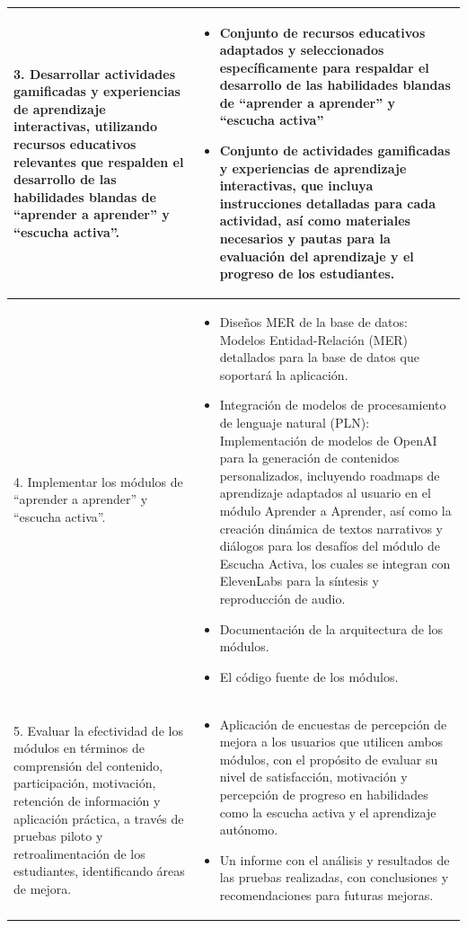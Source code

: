 \begin{longtable}{|p{8cm}|p{8cm}|}
3. Desarrollar actividades gamificadas y experiencias de aprendizaje interactivas, utilizando recursos educativos relevantes que respalden el desarrollo de las habilidades blandas de “aprender a aprender” y “escucha activa”. 
& \begin{itemize}[leftmargin=*, topsep=0pt, partopsep=0pt, parsep=0pt, itemsep=0.4\baselineskip]
     \item Conjunto de recursos educativos adaptados y seleccionados específicamente para respaldar el desarrollo de las habilidades blandas de “aprender a aprender” y “escucha activa”
    \item Conjunto de actividades gamificadas y experiencias de aprendizaje interactivas, que incluya instrucciones detalladas para cada actividad, así como materiales necesarios y pautas para la evaluación del aprendizaje y el progreso de los estudiantes. 
\end{itemize}
\\ \hline

4. Implementar los módulos de “aprender a aprender” y “escucha activa”. 
& \begin{itemize}[leftmargin=*, topsep=0pt, partopsep=0pt, parsep=0pt, itemsep=0.4\baselineskip]
    \item Diseños MER de la base de datos: Modelos Entidad-Relación (MER) detallados para la base de datos que soportará la aplicación.
    \item Integración de modelos de procesamiento de lenguaje natural (PLN): Implementación de modelos de OpenAI para la generación de contenidos personalizados, incluyendo roadmaps de aprendizaje adaptados al usuario en el módulo Aprender a Aprender, así como la creación dinámica de textos narrativos y diálogos para los desafíos del módulo de Escucha Activa, los cuales se integran con ElevenLabs para la síntesis y reproducción de audio.
    \item Documentación de la arquitectura de los módulos.
    \item El código fuente de los módulos.
\end{itemize}
\\ \hline

5. Evaluar la efectividad de los módulos en términos de comprensión del contenido, participación, motivación, retención de información y aplicación práctica, a través de pruebas piloto y retroalimentación de los estudiantes, identificando áreas de mejora.
& \begin{itemize}[leftmargin=*, topsep=0pt, partopsep=0pt, parsep=0pt, itemsep=0.4\baselineskip]
    \item Aplicación de encuestas de percepción de mejora a los usuarios que utilicen ambos módulos, con el propósito de evaluar su nivel de satisfacción, motivación y percepción de progreso en habilidades como la escucha activa y el aprendizaje autónomo.
    \item Un informe con el análisis y resultados de las pruebas realizadas, con conclusiones y recomendaciones para futuras mejoras.
\end{itemize}
\\ \hline

\end{longtable}